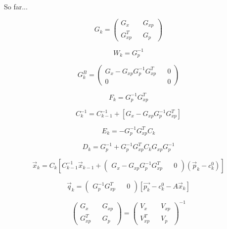 So far...

\begin{equation}
G_k = \begin{pmatrix}
G_x 		&& G_{xp} \\
G^T_{xp} 	&& G_p
\end{pmatrix}
\end{equation}

\begin{equation}
W_k = G_p^{-1}
\end{equation}

\begin{equation}
G_k^B = \begin{pmatrix}
G_x - G_{xp}G_p^{-1}G_{xp}^T 	&& 0 \\
0								&& 0
\end{pmatrix}
\end{equation}

\begin{equation}
F_k = G_p^{-1} G_{xp}^T
\end{equation}

\begin{equation}
C_k^{-1} = C_{k-1}^{-1} + \left[
	G_x - G_{xp}G_p^{-1}G_{xp}^T
\right]
\end{equation}

\begin{equation}
E_k = -G_p^{-1} G_{xp}^T C_k
\end{equation}

\begin{equation}
D_k = G_p^{-1} + G_p^{-1} G_{xp}^T C_k G_{xp} G_p^{-1}
\end{equation}

\begin{equation}
\vec{x}_k = C_k \left[
	C_{k-1}^{-1} \vec{x}_{k-1}
	+ \begin{pmatrix}
		G_x - G_{xp} G_p^{-1} G_{xp}^T && 0
	\end{pmatrix}
	\left(
		\vec{p}_k - c_k^0
	\right)
\right]
\label{eq:VF_new_vertex_final}
\end{equation}

\begin{equation}
\vec{q}_k = \begin{pmatrix}
	G_p^{-1} G_{xp}^T && 0
\end{pmatrix}
\left[
	\vec{p_k} - c_k^0 - A\vec{x}_k
\right]
\label{eq:VF_new_momentum_final}
\end{equation}

\begin{equation}
\begin{pmatrix}
	G_x && G_{xp} \\
	G_{xp}^T && G_p
\end{pmatrix}
=
\begin{pmatrix}
	V_x && V_{xp} \\
	V_{xp}^T && V_p
\end{pmatrix}^{-1}
\end{equation}

